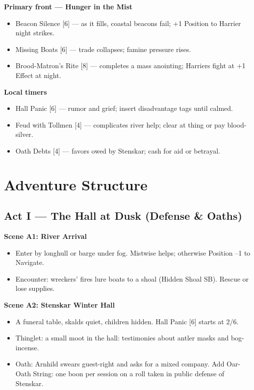 \documentclass[11pt]{article}
\begin{document}
\textbf{Primary front --- Hunger in the Mist}
\begin{itemize}
\item Beacon Silence [6] --- as it fills, coastal beacons fail; +1 Position to Harrier night strikes.
\item Missing Boats [6] --- trade collapses; famine pressure rises.
\item Brood-Matron's Rite [8] --- completes a mass anointing; Harriers fight at +1 Effect at night.
\end{itemize}

\textbf{Local timers}
\begin{itemize}
\item Hall Panic [6] --- rumor and grief; insert disadvantage tags until calmed.
\item Feud with Tollmen [4] --- complicates river help; clear at thing or pay blood-silver.
\item Oath Debts [4] --- favors owed by Stenskar; cash for aid or betrayal.
\end{itemize}

\section{Adventure Structure}

\subsection{Act I --- The Hall at Dusk (Defense \& Oaths)}

\textbf{Scene A1: River Arrival}
\begin{itemize}
\item Enter by longhull or barge under fog. Mistwise helps; otherwise Position --1 to Navigate.
\item Encounter: wreckers' fires lure boats to a shoal (Hidden Shoal SB). Rescue or lose supplies.
\end{itemize}

\textbf{Scene A2: Stenskar Winter Hall}
\begin{itemize}
\item A funeral table, skalds quiet, children hidden. Hall Panic [6] starts at 2/6.
\item Thinglet: a small moot in the hall: testimonies about antler masks and bog-incense.
\item Oath: Arnhild swears guest-right and asks for a mixed company. Add Oar-Oath String: one boon per session on a roll taken in public defense of Stenskar.
\end{itemize}
\end{document}

